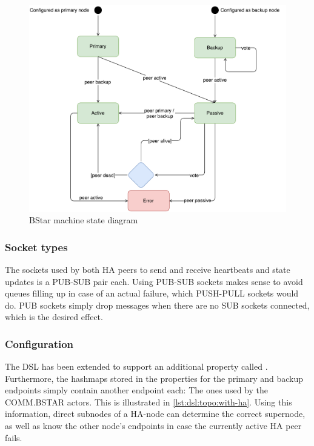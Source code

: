 \begin{figure}[]
	\includegraphics[width=\textwidth]{img/state_machine_diagram_bstar.pdf}
	\caption{BStar machine state diagram}
	\label{fig:bstar:state:diagram}
\end{figure}

\subsubsection{Socket types}
The sockets used by both HA peers to send and receive heartbeats and state
updates is a PUB-SUB pair each. Using PUB-SUB sockets makes sense to avoid queues filling up
in case of an actual failure, which PUSH-PULL sockets would do. PUB sockets simply drop messages when there are
no SUB sockets connected, which is the desired effect.


\subsubsection{Configuration}
The DSL has been extended to support an additional property called
. Furthermore, the hashmaps stored in the properties for
the primary and backup endpoints simply contain another endpoint each: The ones
used by the COMM.BSTAR actors. This is illustrated in \autoref{lst:dsl:topo:with-ha}.
Using this information, direct subnodes of a HA-node can determine the correct
supernode, as well as know the other node's endpoints in case the currently
active HA peer fails.



